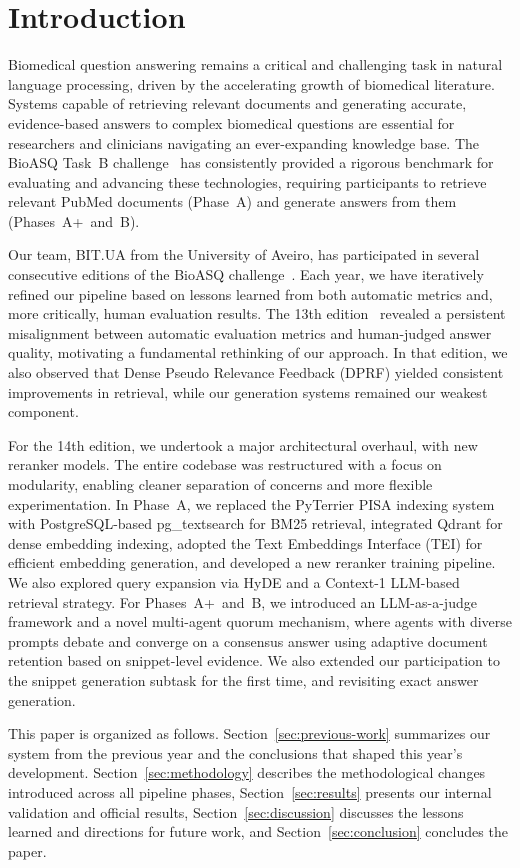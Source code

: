 \section{Introduction}
\label{sec:introduction}

Biomedical question answering remains a critical and challenging task in natural language processing, driven by the accelerating growth of biomedical literature. Systems capable of retrieving relevant documents and generating accurate, evidence-based answers to complex biomedical questions are essential for researchers and clinicians navigating an ever-expanding knowledge base. The BioASQ Task~B challenge~\cite{BioASQ2026,QAcorpusBioASQ} has consistently provided a rigorous benchmark for evaluating and advancing these technologies, requiring participants to retrieve relevant PubMed documents (Phase~A) and generate answers from them (Phases~A+~and~B).

Our team, BIT.UA from the University of Aveiro, has participated in several consecutive editions of the BioASQ challenge~\cite{almeida2024bit, jonker2025bit}. Each year, we have iteratively refined our pipeline based on lessons learned from both automatic metrics and, more critically, human evaluation results. The 13th edition~\cite{jonker2025bit} revealed a persistent misalignment between automatic evaluation metrics and human-judged answer quality, motivating a fundamental rethinking of our approach. In that edition, we also observed that Dense Pseudo Relevance Feedback (DPRF) yielded consistent improvements in retrieval, while our generation systems remained our weakest component.

For the 14th edition, we undertook a major architectural overhaul, with new reranker models. The entire codebase was restructured with a focus on modularity, enabling cleaner separation of concerns and more flexible experimentation. In Phase~A, we replaced the PyTerrier PISA indexing system with PostgreSQL-based pg\_textsearch for BM25 retrieval, integrated Qdrant for dense embedding indexing, adopted the Text Embeddings Interface (TEI) for efficient embedding generation, and developed a new reranker training pipeline. We also explored query expansion via HyDE and a Context-1 LLM-based retrieval strategy. For Phases~A+~and~B, we introduced an LLM-as-a-judge framework and a novel multi-agent quorum mechanism, where agents with diverse prompts debate and converge on a consensus answer using adaptive document retention based on snippet-level evidence. We also extended our participation to the snippet generation subtask for the first time, and revisiting exact answer generation.

This paper is organized as follows. Section~\ref{sec:previous-work} summarizes our system from the previous year and the conclusions that shaped this year's development. Section~\ref{sec:methodology} describes the methodological changes introduced across all pipeline phases, Section~\ref{sec:results} presents our internal validation and official results, Section~\ref{sec:discussion} discusses the lessons learned and directions for future work, and Section~\ref{sec:conclusion} concludes the paper.
